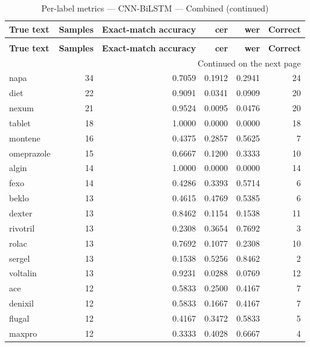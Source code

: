 \begingroup
\setlength{\tabcolsep}{2.5pt}
\renewcommand{\arraystretch}{1.05}
\sloppy
\scriptsize
\begin{longtable}{p{3.0cm}rrrrr}
\caption{Per-label metrics — CNN-BiLSTM — Combined}\label{tab:e2-03_e2cnn_bilstm_evaluation-per-label}\\
\toprule
\textbf{True text} & \textbf{Samples} & \textbf{Exact-match accuracy} & \textbf{cer} & \textbf{wer} & \textbf{Correct} \\
\midrule
\endfirsthead
\caption*{Per-label metrics — CNN-BiLSTM — Combined (continued)}\\
\toprule
\textbf{True text} & \textbf{Samples} & \textbf{Exact-match accuracy} & \textbf{cer} & \textbf{wer} & \textbf{Correct} \\
\midrule
\endhead
\midrule
\multicolumn{6}{r}{Continued on the next page}\\
\endfoot
\bottomrule
\endlastfoot
napa & 34 & 0.7059 & 0.1912 & 0.2941 & 24 \\
diet & 22 & 0.9091 & 0.0341 & 0.0909 & 20 \\
nexum & 21 & 0.9524 & 0.0095 & 0.0476 & 20 \\
tablet & 18 & 1.0000 & 0.0000 & 0.0000 & 18 \\
montene & 16 & 0.4375 & 0.2857 & 0.5625 & 7 \\
omeprazole & 15 & 0.6667 & 0.1200 & 0.3333 & 10 \\
algin & 14 & 1.0000 & 0.0000 & 0.0000 & 14 \\
fexo & 14 & 0.4286 & 0.3393 & 0.5714 & 6 \\
beklo & 13 & 0.4615 & 0.4769 & 0.5385 & 6 \\
dexter & 13 & 0.8462 & 0.1154 & 0.1538 & 11 \\
rivotril & 13 & 0.2308 & 0.3654 & 0.7692 & 3 \\
rolac & 13 & 0.7692 & 0.1077 & 0.2308 & 10 \\
sergel & 13 & 0.1538 & 0.5256 & 0.8462 & 2 \\
voltalin & 13 & 0.9231 & 0.0288 & 0.0769 & 12 \\
ace & 12 & 0.5833 & 0.2500 & 0.4167 & 7 \\
denixil & 12 & 0.5833 & 0.1667 & 0.4167 & 7 \\
flugal & 12 & 0.4167 & 0.3472 & 0.5833 & 5 \\
maxpro & 12 & 0.3333 & 0.4028 & 0.6667 & 4 \\

\end{longtable}
